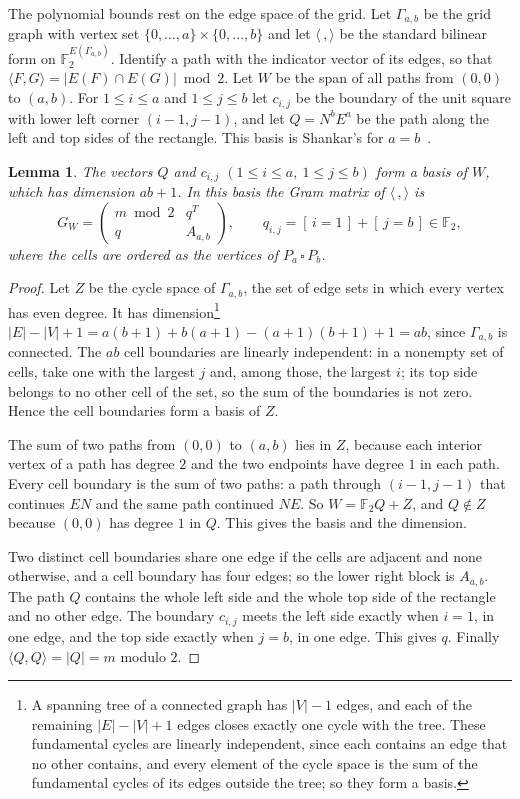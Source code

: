 \documentclass[11pt]{amsart}
\newtheorem{lemma}[theorem]{Lemma}
\theoremstyle{definition}
\theoremstyle{remark}
\numberwithin{equation}{section}
\newcommand{\F}{\mathbb{F}}
\newcommand{\Iv}[1]{[\,#1\,]}
\begin{document}
The polynomial bounds rest on the edge space of the grid. Let $\Gamma_{a,b}$ be the grid graph with vertex set $\{0,\dots,a\}\times\{0,\dots,b\}$ and let $\langle\,,\rangle$ be the standard bilinear form on $\F_2^{E(\Gamma_{a,b})}$. Identify a path with the indicator vector of its edges, so that $\langle F,G\rangle=|E(F)\cap E(G)|\bmod2$. Let $W$ be the span of all paths from $(0,0)$ to $(a,b)$. For $1\le i\le a$ and $1\le j\le b$ let $c_{i,j}$ be the boundary of the unit square with lower left corner $(i-1,j-1)$, and let $Q=N^bE^a$ be the path along the left and top sides of the rectangle. This basis is Shankar's for $a=b$~\cite{Sh}.

\begin{lemma}\label{lem:basis}
The vectors $Q$ and $c_{i,j}$ $(1\le i\le a,\ 1\le j\le b)$ form a basis of $W$, which has dimension $ab+1$. In this basis the Gram matrix of $\langle\,,\rangle$ is
\[
G_W=\begin{pmatrix}m\bmod 2&q^{T}\\ q&A_{a,b}\end{pmatrix},\qquad q_{i,j}=\Iv{i=1}+\Iv{j=b}\in\F_2,
\]
where the cells are ordered as the vertices of $P_a\,\square\,P_b$.
\end{lemma}

\begin{proof}
Let $Z$ be the cycle space of $\Gamma_{a,b}$, the set of edge sets in which every vertex has even degree. It has dimension\footnote{A spanning tree of a connected graph has $|V|-1$ edges, and each of the remaining $|E|-|V|+1$ edges closes exactly one cycle with the tree. These fundamental cycles are linearly independent, since each contains an edge that no other contains, and every element of the cycle space is the sum of the fundamental cycles of its edges outside the tree; so they form a basis.} $|E|-|V|+1=a(b+1)+b(a+1)-(a+1)(b+1)+1=ab$, since $\Gamma_{a,b}$ is connected. The $ab$ cell boundaries are linearly independent: in a nonempty set of cells, take one with the largest $j$ and, among those, the largest $i$; its top side belongs to no other cell of the set, so the sum of the boundaries is not zero. Hence the cell boundaries form a basis of $Z$.

The sum of two paths from $(0,0)$ to $(a,b)$ lies in $Z$, because each interior vertex of a path has degree $2$ and the two endpoints have degree $1$ in each path. Every cell boundary is the sum of two paths: a path through $(i-1,j-1)$ that continues $EN$ and the same path continued $NE$. So $W=\F_2Q+Z$, and $Q\notin Z$ because $(0,0)$ has degree $1$ in $Q$. This gives the basis and the dimension.

Two distinct cell boundaries share one edge if the cells are adjacent and none otherwise, and a cell boundary has four edges; so the lower right block is $A_{a,b}$. The path $Q$ contains the whole left side and the whole top side of the rectangle and no other edge. The boundary $c_{i,j}$ meets the left side exactly when $i=1$, in one edge, and the top side exactly when $j=b$, in one edge. This gives $q$. Finally $\langle Q,Q\rangle=|Q|=m$ modulo $2$.
\end{proof}
\end{document}
